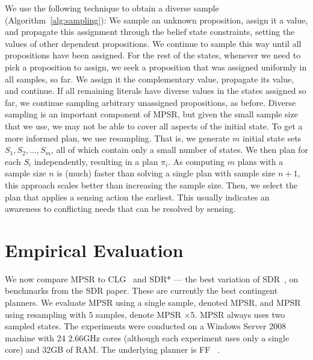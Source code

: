 \documentclass[letterpaper]{article}
\numberwithin{equation}{section}	%
\begin{document}
We use the following technique to obtain a diverse sample (Algorithm~\ref{alg:sampling}):
We  sample an unknown proposition, assign it a value, and propagate this assignment through the belief state constraints, setting the values of other dependent propositions. We continue to sample  this way
until all propositions have been assigned. For the rest of the states, whenever we need to pick a proposition to assign,
we seek a proposition that was assigned uniformly in all samples, so far.
We assign it the complementary value, propagate its value, and continue. If all
remaining literals have diverse values in the states assigned so far, we continue sampling arbitrary unassigned propositions,
as before.
Diverse sampling is an important component of MPSR, but given the small sample size that we use, we may not be able to cover all aspects of
the initial state. To get a more informed plan, we use resampling.
That is, we generate $m$ initial state sets $S_1,S_2,...,S_m$, all of which contain only a small number of states. We then plan for each $S_i$ independently, resulting in a plan $\pi_i$. As computing $m$ plans with a sample size $n$ is (much) faster than solving a single plan with sample size $n+1$, this approach scales better than increasing the sample size.
Then, we select the plan that applies a sensing action the earliest. This usually indicates an awareness to conflicting needs that can be resolved by sensing.
\section{Empirical Evaluation}
We now compare MPSR to CLG~\citep{AlborePG09} and SDR* --- the best variation of SDR~\citep{SDR}, on benchmarks from the SDR paper. These are currently the best contingent planners. We evaluate MPSR using a single sample, denoted MPSR, and MPSR using resampling with $5$ samples, denote MPSR $\times 5$. MPSR  always uses two sampled states. The experiments were conducted on a Windows Server 2008 machine with 24 2.66GHz cores (although each experiment uses only a single core) and 32GB of RAM. The underlying planner is FF ~\citep{hoffmann:nebel:jair-01}.
\end{document}
